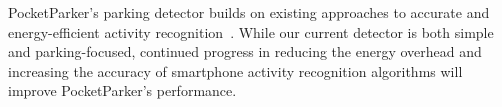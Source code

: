 PocketParker's parking detector builds on existing approaches to accurate
and energy-efficient activity recognition~\cite{Constandache:2010:DYS,
Keally:2011:PTP, Reddy:2010:UMP, Yang:2011:DDP, Wang:2009:FEE}. While our
current detector is both simple and parking-focused, continued progress in
reducing the energy overhead and increasing the accuracy of smartphone
activity recognition algorithms will improve PocketParker's performance.

